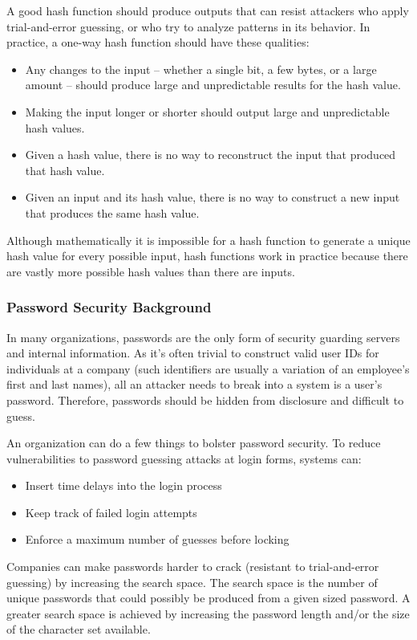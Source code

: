 A good hash function should produce outputs that can resist attackers who apply trial-and-error guessing, or who try to analyze patterns in its behavior. In practice, a one-way hash function should have these qualities:
\begin{itemize}
  \item Any changes to the input -- whether a single bit, a few bytes, or a large amount --  should produce large and unpredictable results for the hash value.
  \item Making the input longer or shorter should output large and unpredictable hash values.
  \item Given a hash value, there is no way to reconstruct the input that produced that hash value.
  \item Given an input and its hash value, there is no way to construct a new input that produces the same hash value.
\end{itemize}
Although mathematically it is impossible for a hash function to generate a unique hash value for every possible input, hash functions work in practice because there are vastly more possible hash values than there are inputs.

\subsubsection{Password Security Background}
In many organizations, passwords are the only form of security guarding servers and internal information. As it’s often trivial to construct valid user IDs for individuals at a company (such identifiers are usually a variation of an employee's first and last names), all an attacker needs to break into a system is a user’s password. Therefore, passwords should be hidden from disclosure and difficult to guess.

An organization can do a few things to bolster password security. To reduce vulnerabilities to password guessing attacks at login forms, systems can:
\begin{itemize}
  \item Insert time delays into the login process
  \item Keep track of failed login attempts
  \item Enforce a maximum number of guesses before locking
\end{itemize}
Companies can make passwords harder to crack (resistant to trial-and-error guessing) by increasing the search space. The search space is the number of unique passwords that could possibly be produced from a given sized password. A greater search space is achieved by increasing the password length and/or the size of the character set available.

